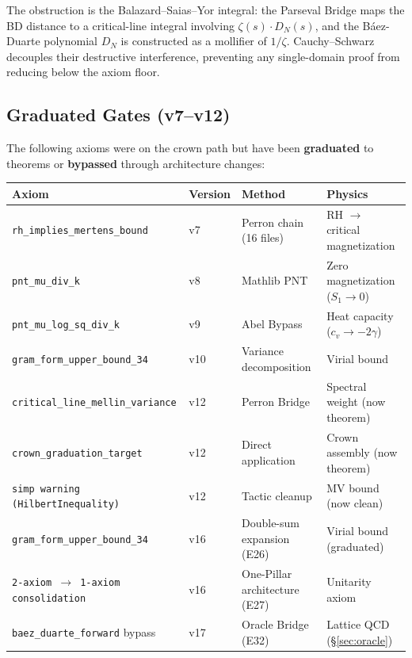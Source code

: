 \documentclass[11pt,a4paper]{article}
\begin{document}
The obstruction is the Balazard--Saias--Yor integral: the Parseval Bridge
maps the BD distance to a critical-line integral involving $\zeta(s) \cdot D_N(s)$,
and the B\'aez-Duarte polynomial $D_N$ is constructed as a mollifier of
$1/\zeta$. Cauchy--Schwarz decouples their destructive interference,
preventing any single-domain proof from reducing below the axiom floor.

\subsection{Graduated Gates (v7--v12)}

The following axioms were on the crown path but have been \textbf{graduated}
to theorems or \textbf{bypassed} through architecture changes:

\begin{center}
\small
\begin{tabular}{@{}llll@{}}
\toprule
\textbf{Axiom} & \textbf{Version} & \textbf{Method} & \textbf{Physics} \\
\midrule
\texttt{rh\_implies\_mertens\_bound} & v7 & Perron chain (16 files) & RH $\to$ critical magnetization \\
\texttt{pnt\_mu\_div\_k} & v8 & Mathlib PNT & Zero magnetization ($S_1 \to 0$) \\
\texttt{pnt\_mu\_log\_sq\_div\_k} & v9 & Abel Bypass & Heat capacity ($c_v \to -2\gamma$) \\
\texttt{gram\_form\_upper\_bound\_34} & v10 & Variance decomposition & Virial bound \\
\texttt{critical\_line\_mellin\_variance} & v12 & Perron Bridge & Spectral weight (now theorem) \\
\texttt{crown\_graduation\_target} & v12 & Direct application & Crown assembly (now theorem) \\
\texttt{simp warning (HilbertInequality)} & v12 & Tactic cleanup & MV bound (now clean) \\
\texttt{gram\_form\_upper\_bound\_34} & v16 & Double-sum expansion (E26) & Virial bound (graduated) \\
\texttt{2-axiom $\to$ 1-axiom consolidation} & v16 & One-Pillar architecture (E27) & Unitarity axiom \\
\texttt{baez\_duarte\_forward} bypass & v17 & Oracle Bridge (E32) & Lattice QCD (\S\ref{sec:oracle}) \\
\bottomrule
\end{tabular}
\end{center}
\end{document}
